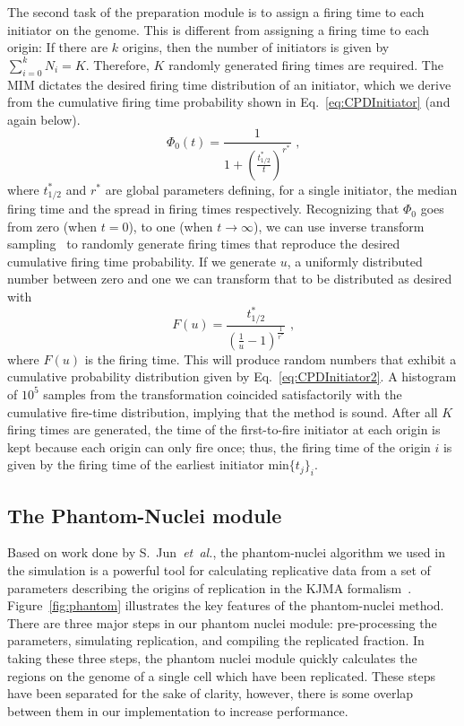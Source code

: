 		The second task of the preparation module is to assign a firing time to each initiator on the genome.
		This is different from assigning a firing time to each origin: If there are $k$ origins, then the number of initiators is given by $\sum\nolimits_{i=0}^k N_i = K$.
		Therefore, $K$ randomly generated firing times are required.
		The MIM dictates the desired firing time distribution of an initiator, which we derive from the cumulative firing time probability shown in Eq.~\ref{eq:CPDInitiator} (and again below).
		\begin{equation} \label{eq:CPDInitiator2}
			\Phi_0(t) = \frac{1}{1+\left(\frac{t^*_{1/2}}{t}\right)^{r^*}}\text{ ,}
		\end{equation}
		where $t^*_{1/2}$ and $r^*$ are global parameters defining, for a single initiator, the median firing time and the spread in firing times respectively. 
		Recognizing that $\Phi_0$ goes from zero (when $t=0$), to one (when $t \rightarrow \infty$), we can use inverse transform sampling~\cite{NumRec} to randomly generate firing times that reproduce the desired cumulative firing time probability.
		If we generate $u$, a uniformly distributed number between zero and one we can transform that to be distributed as desired with
		\begin{equation}
			F(u) = \frac{t^*_{1/2}}{\left(\frac{1}{u}-1\right)^\frac{1}{r^*}} \text{ ,}
		\end{equation}
		where $F(u)$ is the firing time.
		This will produce random numbers that exhibit a cumulative probability distribution given by Eq.~\ref{eq:CPDInitiator2}.
		A histogram of $10^5$ samples from the transformation coincided satisfactorily with the cumulative fire-time distribution, implying that the method is sound.
		After all $K$ firing times are generated, the time of the first-to-fire initiator at each origin is kept because each origin can only fire once; thus, the firing time of the origin $i$ is given by the firing time of the earliest initiator $\text{min}\{t_j\}_i$.
		
		
		\subsection{The Phantom-Nuclei module}
		\label{subsec:PhanNuc}
		
		Based on work done by S.~Jun~\emph{et~al.}, the phantom-nuclei algorithm we used in the simulation is a powerful tool for calculating replicative data from a set of parameters describing the origins of replication in the KJMA formalism~\cite{KJMA1}.
		Figure~\ref{fig:phantom} illustrates the key features of the phantom-nuclei method.
		There are three major steps in our phantom nuclei module: pre-processing the parameters, simulating replication, and compiling the replicated fraction.
		In taking these three steps, the phantom nuclei module quickly calculates the regions on the genome of a single cell which have been replicated.
		These steps have been separated for the sake of clarity, however, there is some overlap between them in our implementation to increase performance.
		
